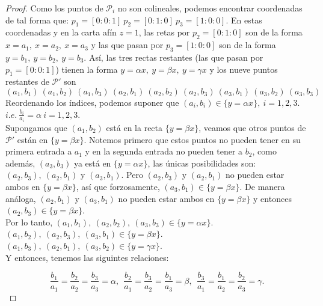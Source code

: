 \begin{proof}

Como los puntos de $\mathcal{P}_{i}$ no son colineales, podemos encontrar coordenadas de tal forma que: $p_{1} = [0:0:1]\ p_{2} = [0:1:0]\ p_{3} = [1:0:0]$. En estas coordenadas y en la carta afín $z=1$, las retas por $p_{2} = [0:1:0]$ son de la forma $x=a_{1},\ x=a_{2},\ x=a_{3}$ y las que pasan por $p_{3} = [1:0:0]$ son de la forma $y=b_{1},\ y=b_{2},\ y=b_{3}$. Así, las tres rectas restantes (las que pasan por $p_{1} = [0:0:1]$) tienen la forma $ y = \alpha x,\ y = \beta x,\ y = \gamma x$ y los nueve puntos restantes de $\mathcal{P'}$ son $(a_{1},b_{1})\ (a_{1},b_{2})\ (a_{1},b_{3})\ (a_{2},b_{1})\ (a_{2},b_{2})\ (a_{2},b_{3})\ (a_{3},b_{1})\ (a_{3},b_{2})\ (a_{3},b_{3})\ $
\\

Reordenando los índices, podemos suponer que $(a_{i}, b_{i}) \in \{ y = \alpha x \},\ i=1,2,3$. $\mathit{i.e.}\ \frac{b_{i}}{a_{i}} = \alpha \ i=1,2,3$.
\\

Supongamos que $(a_{1},b_{2})$ está en la recta $\{ y = \beta x\}$, veamos que otros puntos de $\mathcal{P'}$ están en $\{ y = \beta x\}$. Notemos primero que estos puntos no pueden tener en su primera entrada a $a_{1}$ y en la segunda entrada no pueden tener a $b_{2}$, como además, $(a_{3},b_{3})$ ya está en $\{ y = \alpha x \}$, las únicas posibilidades son: $(a_{2}, b_{3}),\ (a_{2}, b_{1})$ y $(a_{3}, b_{1})$. Pero $(a_{2}, b_{3})$ y $(a_{2}, b_{1})$ no pueden estar ambos en $\{ y = \beta x\}$, así que forzosamente, $(a_{3},b_{1}) \in \{ y = \beta x\}$. De manera análoga, $(a_{2},b_{1})$ y $(a_{3},b_{1})$ no pueden estar ambos en $\{ y = \beta x\}$ y entonces $(a_{2},b_{3}) \in \{ y = \beta x\}$.
\\

Por lo tanto, $(a_{1},b_{1}),\ (a_{2},b_{2}),\ (a_{3},b_{3})\in \{ y = \alpha x\}$.
\\
$(a_{1},b_{2}),\ (a_{2},b_{3}),\ (a_{3},b_{1})\in \{ y = \beta x\}$.
\\
$(a_{1},b_{3}),\ (a_{2},b_{1}),\ (a_{3},b_{2})\in \{ y = \gamma x\}$.
\\

Y entonces, tenemos las siguintes relaciones:

$$\frac{b_{1}}{a_{1}}=\frac{b_{2}}{a_{2}}=\frac{b_{3}}{a_{3}}=\alpha,\ \ \frac{b_{2}}{a_{1}}=\frac{b_{3}}{a_{2}}=\frac{b_{1}}{a_{3}}=\beta,\ \ \frac{b_{3}}{a_{1}}=\frac{b_{1}}{a_{2}}=\frac{b_{2}}{a_{3}}=\gamma.$$


\end{proof}
